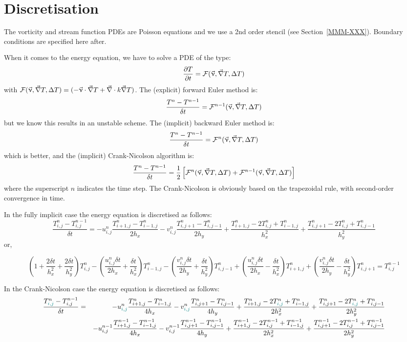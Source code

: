 \section*{Discretisation}

The vorticity and stream function PDEs are Poisson equations and we use a 2nd order 
stencil (see Section~\ref{MMM-XXX}). Boundary conditions are specified here after.


When it comes to the energy equation, we have to solve a PDE of the type:
\[
\frac{\partial T}{\partial t} = {\cal F}(\vec \upnu,\vec\nabla T,\Delta T)
\]
with ${\cal F}(\vec \upnu,\vec\nabla T,\Delta T)=(-\vec\upnu\cdot\vec\nabla T + \vec\nabla\cdot k\vec\nabla T)$.
The (explicit) forward Euler method is: 
\[
\frac{T^{n}-T^{n-1}}{\delta t} = {\cal F}^{n-1}(\vec \upnu,\vec\nabla T,\Delta T)
\]
but we know this results in an unstable scheme.
The (implicit) backward Euler method is: 
\[
\frac{T^{n}-T^{n-1}}{\delta t} = {\cal F}^{n}(\vec \upnu,\vec\nabla T,\Delta T)
\]
which is better, 
and the (implicit) Crank-Nicolson algorithm is: 
\[
\frac{T^{n}-T^{n-1}}{\delta t} = 
\frac{1}{2}
\left[
{\cal F}^{n}(\vec \upnu,\vec\nabla T,\Delta T)
+
{\cal F}^{n-1}(\vec \upnu,\vec\nabla T,\Delta T)
\right]
\]
where the superscript $n$ indicates the time step.
The Crank-Nicolson is obviously based on the trapezoidal rule, with second-order convergence in time.

In the fully implicit case the energy equation is discretised as follows:
\[
\frac{T_{i,j}^n-T_{i,j}^{n-1}}{\delta t} =
- u^n_{i,j} \frac{T^n_{i+1,j}-T^n_{i-1,j}}{2h_x}
- v^n_{i,j} \frac{T^n_{i,j+1}-T^n_{i,j-1}}{2h_y}
+ \frac{T^n_{i+1,j}-2T^n_{i,j}+T^n_{i-1,j}}{h_x^2}
+ \frac{T^n_{i,j+1}-2T^n_{i,j}+T^n_{i,j-1}}{h_y^2}
\]
or,
\begin{footnotesize}
\[
\left(1 +\frac{2 \delta t}{h_x^2} +\frac{2 \delta t}{h_y^2} \right)  T^n_{i,j}
-\left(\frac{u^n_{i,j} \delta t}{2h_x} +\frac{\delta t}{h_x^2} \right) T^n_{i-1,j}
-\left(\frac{v^n_{i,j} \delta t}{2h_y} +\frac{\delta t}{h_y^2} \right) T^n_{i,j-1}+
\left(\frac{u^n_{i,j} \delta t}{2h_x} -\frac{\delta t}{h_x^2} \right)  T^n_{i+1,j}+
\left(\frac{v^n_{i,j} \delta t}{2h_y} -\frac{\delta t}{h_y^2} \right)  T^n_{i,j+1}
=
T_{i,j}^{n-1}
\]
\end{footnotesize}
In the Crank-Nicolson case the energy equation is discretised as follows:
\begin{eqnarray}
\frac{T_{{\color{teal} i,j}}^n-T_{i,j}^{n-1}}{\delta t} 
&=& 
- u^n_{{\color{teal} i,j}} \frac{T^n_{i+1,j}-T^n_{i-1,j}}{4h_x}
- v^n_{{\color{teal} i,j}} \frac{T^n_{i,j+1}-T^n_{i,j-1}}{4h_y}
+ \frac{T^n_{i+1,j}-2T^n_{{\color{teal} i,j}}+T^n_{i-1,j}}{2h_x^2}
+ \frac{T^n_{i,j+1}-2T^n_{{\color{teal} i,j}}+T^n_{i,j-1}}{2h_y^2} \nonumber\\
&&
- u^{n-1}_{i,j} \frac{T^{n-1}_{i+1,j}-T^{n-1}_{i-1,j}}{4h_x}
- v^{n-1}_{i,j} \frac{T^{n-1}_{i,j+1}-T^{n-1}_{i,j-1}}{4h_y}
+ \frac{T^{n-1}_{i+1,j}-2T^{n-1}_{i,j}+T^{n-1}_{i-1,j}}{2h_x^2}
+ \frac{T^{n-1}_{i,j+1}-2T^{n-1}_{i,j}+T^{n-1}_{i,j-1}}{2h_y^2} \nonumber
\end{eqnarray}


